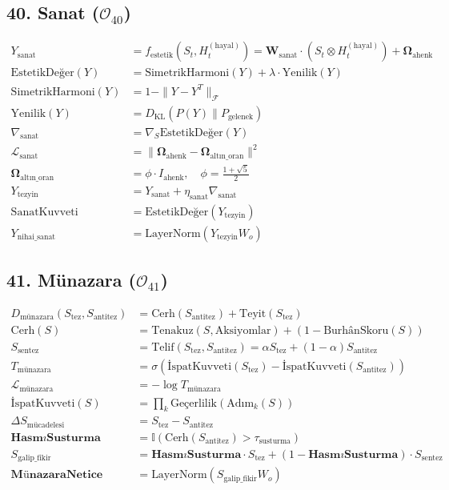 \documentclass[11pt, a4paper]{article}
\begin{document}
\subsection{40. Sanat ($\mathcal{O}_{40}$)}
\begin{align}
Y_{\text{sanat}} &= f_{\text{estetik}}(S_t, H_t^{(\text{hayal})}) = \mathbf{W}_{\text{sanat}} \cdot \left( S_t \otimes H_t^{(\text{hayal})} \right) + \mathbf{\Omega}_{\text{ahenk}} \\
\text{EstetikDeğer}(Y) &= \text{SimetrikHarmoni}(Y) + \lambda \cdot \text{Yenilik}(Y) \\
\text{SimetrikHarmoni}(Y) &= 1 - \| Y - Y^T \|_{\mathcal{F}} \\
\text{Yenilik}(Y) &= D_{\text{KL}}(P(Y) \parallel P_{\text{gelenek}}) \\
\nabla_{\text{sanat}} &= \nabla_S \text{EstetikDeğer}(Y) \\
\mathcal{L}_{\text{sanat}} &= \|\mathbf{\Omega}_{\text{ahenk}} - \mathbf{\Omega}_{\text{altın\_oran}}\|^2 \\
\mathbf{\Omega}_{\text{altın\_oran}} &= \phi \cdot I_{\text{ahenk}}, \quad \phi = \frac{1+\sqrt{5}}{2} \\
Y_{\text{tezyin}} &= Y_{\text{sanat}} + \eta_{\text{sanat}} \nabla_{\text{sanat}} \\
\text{SanatKuvveti} &= \text{EstetikDeğer}(Y_{\text{tezyin}}) \\
Y_{\text{nihai\_sanat}} &= \text{LayerNorm}(Y_{\text{tezyin}} W_o)
\end{align}

\subsection{41. Münazara ($\mathcal{O}_{41}$)}
\begin{align}
D_{\text{münazara}}(S_{\text{tez}}, S_{\text{antitez}}) &= \text{Cerh}(S_{\text{antitez}}) + \text{Teyit}(S_{\text{tez}}) \\
\text{Cerh}(S) &= \text{Tenakuz}(S, \text{Aksiyomlar}) + (1 - \text{BurhânSkoru}(S)) \\
S_{\text{sentez}} &= \text{Telif}(S_{\text{tez}}, S_{\text{antitez}}) = \alpha S_{\text{tez}} + (1-\alpha) S_{\text{antitez}} \\
T_{\text{münazara}} &= \sigma\left( \text{İspatKuvveti}(S_{\text{tez}}) - \text{İspatKuvveti}(S_{\text{antitez}}) \right) \\
\mathcal{L}_{\text{münazara}} &= -\log T_{\text{münazara}} \\
\text{İspatKuvveti}(S) &= \prod_{k} \text{Geçerlilik}(\text{Adım}_k(S)) \\
\Delta S_{\text{mücadelesi}} &= S_{\text{tez}} - S_{\text{antitez}} \\
\mathbf{HasmıSusturma} &= \mathbb{I}(\text{Cerh}(S_{\text{antitez}}) > \tau_{\text{susturma}}) \\
S_{\text{galip\_fikir}} &= \mathbf{HasmıSusturma} \cdot S_{\text{tez}} + (1 - \mathbf{HasmıSusturma}) \cdot S_{\text{sentez}} \\
\mathbf{MünazaraNetice} &= \text{LayerNorm}(S_{\text{galip\_fikir}} W_o)
\end{align}
\end{document}
